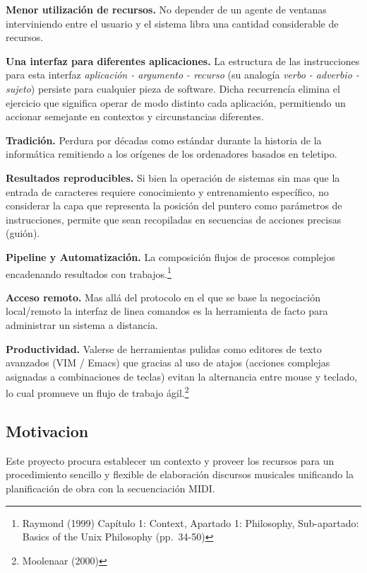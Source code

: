 \documentclass[]{article}
\begin{document}
\textbf{Menor utilización de recursos.} No depender de un agente de
ventanas interviniendo entre el usuario y el sistema libra una cantidad
considerable de recursos.

\textbf{Una interfaz para diferentes aplicaciones.} La estructura de las
instrucciones para esta interfaz \emph{aplicación - argumento - recurso}
(su analogía \emph{verbo - adverbio - sujeto}) persiste para cualquier
pieza de software. Dicha recurrencía elimina el ejercicio que significa
operar de modo distinto cada aplicación, permitiendo un accionar
semejante en contextos y circunstancias diferentes.

\textbf{Tradición.} Perdura por décadas como estándar durante la
historia de la informática remitiendo a los orígenes de los ordenadores
basados en teletipo.

\textbf{Resultados reproducibles.} Si bien la operación de sistemas sin
mas que la entrada de caracteres requiere conocimiento y entrenamiento
específico, no considerar la capa que representa la posición del puntero
como parámetros de instrucciones, permite que sean recopiladas en
secuencias de acciones precisas (guión).

\textbf{Pipeline y Automatización.} La composición flujos de procesos
complejos encadenando resultados con trabajos.\footnote{Raymond (1999)
  Capítulo 1: Context, Apartado 1: Philosophy, Sub-apartado: Basics of
  the Unix Philosophy (pp.~34-50)}

\textbf{Acceso remoto.} Mas allá del protocolo en el que se base la
negociación local/remoto la interfaz de linea comandos es la herramienta
de facto para administrar un sistema a distancia.

\textbf{Productividad.} Valerse de herramientas pulidas como editores de
texto avanzados (VIM / Emacs) que gracias al uso de atajos (acciones
complejas asignadas a combinaciones de teclas) evitan la alternancia
entre mouse y teclado, lo cual promueve un flujo de trabajo
ágil.\footnote{Moolenaar (2000)}

\hypertarget{motivacion}{%
\subsection{Motivacion}\label{motivacion}}

Este proyecto procura establecer un contexto y proveer los recursos para
un procedimiento sencillo y flexible de elaboración discursos musicales
unificando la planificación de obra con la secuenciación MIDI.
\end{document}
